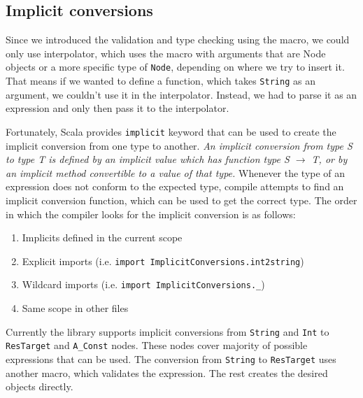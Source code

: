 \subsection{Implicit conversions}
Since we introduced the validation and type checking using the macro, we could only use interpolator, which uses the macro with arguments that are Node objects or a more specific type of \texttt{Node}, depending on where we try to insert it. That means if we wanted to define a function, which takes \texttt{String} as an argument, we couldn't use it in the interpolator. Instead, we had to parse it as an expression and only then pass it to the interpolator.

Fortunately, Scala provides \texttt{implicit} keyword that can be used to create the implicit conversion from one type to another. \textit{An implicit conversion from type S to type T is defined by an implicit value which has function type S $\rightarrow$ T, or by an implicit method convertible to a value of that type.}\cite{Implicit} Whenever the type of an expression does not conform to the expected type, compile attempts to find an implicit conversion function, which can be used to get the correct type. The order in which the compiler looks for the implicit conversion is as follows: \cite{Looking up Implicits}
\begin{enumerate}
  \item Implicits defined in the current scope
  \item Explicit imports (i.e. \texttt{import ImplicitConversions.int2string})
  \item Wildcard imports (i.e. \texttt{import ImplicitConversions.\_})
  \item Same scope in other files
\end{enumerate}

Currently the library supports implicit conversions from \texttt{String} and \texttt{Int} to \texttt{ResTarget} and \texttt{A\_Const} nodes. These nodes cover majority of possible expressions that can be used. The conversion from \texttt{String} to \texttt{ResTarget} uses another macro, which validates the expression. The rest creates the desired objects directly.


